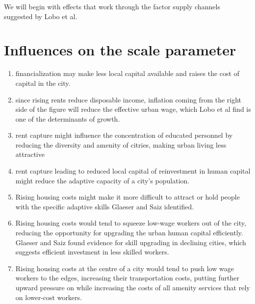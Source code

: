 

We will begin with effects that work through the factor supply channels suggested by Lobo et al. 


\section{Influences on the scale parameter}

 
\begin{enumerate}
    \item financialization may make less local capital available and raises the cost of capital in the city. 
    
\item since rising rents reduce disposable income, inflation coming from the right  side of the figure will reduce  the effective urban wage, which Lobo et al find is one of the determinants of growth.

\item rent capture might influence the concentration of educated personnel by reducing the diversity and amenity of citries, making urban living less attractive 

\item rent capture leading to reduced local capital of reinvestment in human capital  might reduce the adaptive capacity of a city's population.

\item Rising housing costs might make it more difficult to attract or hold people with the specific adaptive skills Glaeser and Saiz identified.

\item  Rising housing costs would tend to squeeze low-wage workers out of the city, reducing the opportunity for upgrading the urban human capital efficiently. Glaeser and Saiz found   evidence for skill upgrading  in declining cities, which suggests efficient investment in less skilled workers. 

\item Rising housing costs at the centre of a city would tend to push low wage workers to the edges, increasing their transportation costs, putting further upward pressure on while increasing the costs of all amenity services that rely on lower-cost workers.


\end{enumerate}
